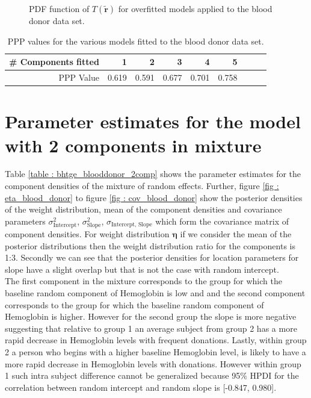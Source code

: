 \begin{figure}[!htb]
	\caption{PDF function of $T(\boldsymbol{\tilde{r}})$ for overfitted models applied to the blood donor data set.}
	\label{fig : ppc_blood_donor_overfitted}    
\end{figure} 

\begin{table}[!htb]
\centering
\captionsetup{justification=centering}
\caption{PPP values for the various models fitted to the blood donor data set.}
\label{table : ppp_blood_donor}
\begin{tabular}{@{}rrrrrrrrr@{}}
\toprule
\# Components fitted & 1 & 2 & 3 & 4 & 5\\ \midrule
PPP Value & 0.619 & 0.591 & 0.677 & 0.701 & 0.758\\ \bottomrule
\end{tabular}
\end{table}

\section{Parameter estimates for the model with 2 components in mixture}
Table \ref{table : bhtge_blooddonor_2comp} shows the parameter estimates for the component densities of the mixture of random effects. Further, figure \ref{fig : eta_blood_donor} to figure \ref{fig : cov_blood_donor} show the posterior densities of the weight distribution, mean of the component densities and covariance parameters $\sigma^2_\text{Intercept}$, $\sigma^2_\text{Slope}$, $\sigma_\text{Intercept, Slope}$ which form the covariance matrix of component densities. For weight distribution $\boldsymbol{\eta}$ if we consider the mean of the posterior distributions then the weight distribution ratio for the components is 1:3. Secondly we can see that the posterior densities for location parameters for slope have a slight overlap but that is not the case with random intercept.\\

The first component in the mixture corresponds to the group for which the baseline random component of Hemoglobin is low and and the second component corresponds to the group for which the baseline random component of Hemoglobin is higher. However for the second group the slope is more negative suggesting that relative to group 1 an average subject from group 2 has a more rapid decrease in Hemoglobin levels with frequent donations. Lastly, within group 2 a person who begins with a higher baseline Hemoglobin level, is likely to have a more rapid decrease in Hemoglobin levels with donations. However within group 1 such intra subject difference cannot be generalized because 95\% HPDI for the correlation between random intercept and random slope is [-0.847, 0.980].\\

